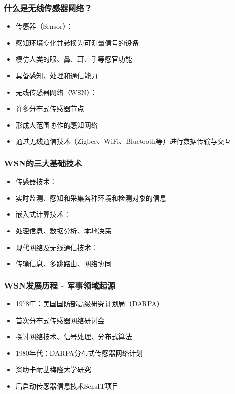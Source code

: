 \documentclass[aspectratio=43]{beamer}
\begin{document}
\begin{frame}
  \frametitle{什么是无线传感器网络？}

  \begin{itemize}
  \item<+-> 传感器（Sensor）：
  \item<+-> 感知环境变化并转换为可测量信号的设备
  \item<+-> 模仿人类的眼、鼻、耳、手等感官功能
  \item<+-> 具备感知、处理和通信能力
  \item<+-> 无线传感器网络（WSN）：
  \item<+-> 许多分布式传感器节点
  \item<+-> 形成大范围协作的感知网络
  \item<+-> 通过无线通信技术（Zigbee、WiFi、Bluetooth等）进行数据传输与交互
  \end{itemize}
\end{frame}

\begin{frame}
  \frametitle{WSN的三大基础技术}

  \begin{itemize}
  \item<+-> 传感器技术：
  \item<+-> 实时监测、感知和采集各种环境和检测对象的信息
  \item<+-> 嵌入式计算技术：
  \item<+-> 处理信息、数据分析、本地决策
  \item<+-> 现代网络及无线通信技术：
  \item<+-> 传输信息、多跳路由、网络协同
  \end{itemize}
\end{frame}

\begin{frame}
  \frametitle{WSN发展历程 - 军事领域起源}

  \begin{itemize}
  \item<+-> 1978年：美国国防部高级研究计划局（DARPA）
  \item<+-> 首次分布式传感器网络研讨会
  \item<+-> 探讨网络技术、信号处理、分布式算法
  \item<+-> 1980年代：DARPA分布式传感器网络计划
  \item<+-> 资助卡耐基梅隆大学研究
  \item<+-> 后启动传感器信息技术SensIT项目
  \end{itemize}
\end{frame}
\end{document}
